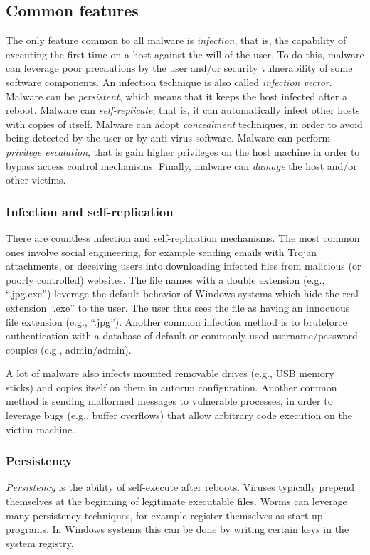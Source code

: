 \documentclass[a4paper,12pt]{article}
\begin{document}
\subsection{Common features}
The only feature common to all malware is \textit{infection}, that is, the capability of executing the first time on a host against the will of the user. To do this, malware can leverage poor precautions by the user and/or security vulnerability of some software components. An infection technique is also called \textit{infection vector}. Malware can be \textit{persistent}, which means that it keeps the host infected after a reboot. Malware can \textit{self-replicate}, that is, it can automatically infect other hosts with copies of itself. Malware can adopt \textit{concealment} techniques, in order to avoid being detected by the user or by anti-virus software. Malware can perform \textit{privilege escalation}, that is gain higher privileges on the host machine in order to bypass access control mechanisms. Finally, malware can \textit{damage} the host and/or other victims.

\subsubsection{Infection and self-replication}
There are countless infection and self-replication mechanisms. The most common ones involve social engineering, for example sending emails with Trojan attachments, or deceiving users into downloading infected files from malicious (or poorly controlled) websites. The file names with a double extension (e.g., “.jpg.exe”) leverage the default behavior of Windows systems which hide the real extension “.exe” to the user. The user thus sees the file as having an innocuous file extension (e.g., “.jpg”). Another common infection method is to bruteforce authentication with a database of default or commonly used username/password couples (e.g., admin/admin).

A lot of malware also infects mounted removable drives (e.g., USB memory sticks) and copies itself on them in autorun configuration. Another common method is sending malformed messages to vulnerable processes, in order to leverage bugs (e.g., buffer overflows) that allow arbitrary code execution on the victim machine.

\subsubsection{Persistency}
\textit{Persistency} is the ability of self-execute after reboots. Viruses typically prepend themselves at the beginning of legitimate executable files. Worms can leverage many persistency techniques, for example register themselves as start-up programs. In Windows systems this can be done by writing certain keys in the system registry.
\end{document}
